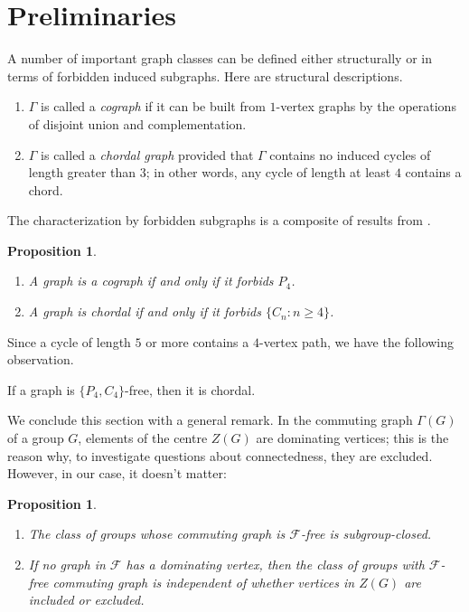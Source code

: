 \documentclass{elsarticle}
\newtheorem{prop}[theorem]{Proposition}
\begin{document}
\section{Preliminaries}\label{ten-sec}

A number of important graph classes can be defined either structurally or in terms of forbidden induced subgraphs. Here are structural descriptions.
\begin{enumerate}
\item
$\Gamma$ is called a {\em cograph} if it can be built from $1$-vertex graphs
by the operations of disjoint union and complementation.
\item
$\Gamma$ is called a {\em chordal graph} provided that $\Gamma$ contains no induced cycles of length greater than $3$; in other words,
any cycle of length at least $4$ contains a chord.
\end{enumerate}

The characterization by forbidden subgraphs is a composite of results from
\cite{FH,ChHa,Sumner,CRST}.

\begin{prop}\label{t:forbid}
\begin{enumerate}
\item A graph is a cograph if and only if it forbids $P_4$.
\item A graph is chordal if and only if it forbids $\{C_n:n\ge4\}$.
\end{enumerate}
\end{prop}

Since a cycle of length $5$ or more contains a $4$-vertex path, we have the following observation.

\begin{obs}\label{n-obs1}
If a graph is $\{P_4,C_4\}$-free, then it is chordal.
\end{obs}

We conclude this section with a general remark.
In the commuting graph $\Gamma(G)$ of a group $G$, elements of the centre
$Z(G)$ are dominating vertices; this is the reason why, to investigate questions
about connectedness, they are excluded. However, in our case,
it doesn't matter:

\begin{prop}\label{cog-subg}
\begin{enumerate}
\item The class of groups whose commuting graph is $\mathcal{F}$-free is
subgroup-closed.
\item If no graph in $\mathcal{F}$ has a dominating vertex, then the class of
groups with $\mathcal{F}$-free commuting graph is independent of whether
vertices in $Z(G)$ are included or excluded.
\end{enumerate}
\end{prop}
\end{document}
